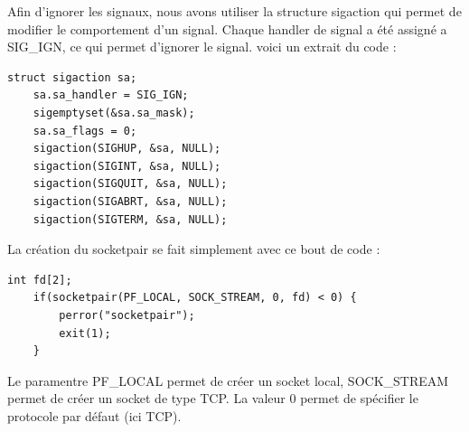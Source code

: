 \documentclass[
	a4paper, %
	10pt, %
]{CSUniSchoolLabReport}
\begin{document}
Afin d'ignorer les signaux, nous avons utiliser la structure sigaction qui permet de modifier le comportement d'un signal.
Chaque handler de signal a été assigné a SIG\_IGN, ce qui permet d'ignorer le signal.
voici un extrait du code :

\begin{lstlisting}[style=CStyle]
	struct sigaction sa;
	sa.sa_handler = SIG_IGN;
	sigemptyset(&sa.sa_mask);
	sa.sa_flags = 0;
	sigaction(SIGHUP, &sa, NULL);
	sigaction(SIGINT, &sa, NULL);
	sigaction(SIGQUIT, &sa, NULL);
	sigaction(SIGABRT, &sa, NULL);
	sigaction(SIGTERM, &sa, NULL);
\end{lstlisting}
La création du socketpair se fait simplement avec ce bout de code :
\begin{lstlisting}[style=CStyle]
	int fd[2];
    if(socketpair(PF_LOCAL, SOCK_STREAM, 0, fd) < 0) {
        perror("socketpair");
        exit(1);
    }
\end{lstlisting}
Le paramentre PF\_LOCAL permet de créer un socket local, SOCK\_STREAM permet de créer un socket de type TCP. La valeur 0 permet de spécifier le protocole par défaut (ici TCP).
\end{document}
